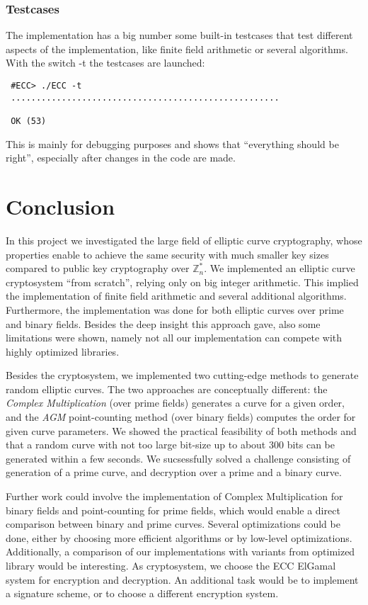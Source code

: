 \documentclass[11pt,english]{article}
\begin{document}
\subsubsection{Testcases}
The implementation has a big number some built-in testcases that test different aspects of the implementation, like finite field arithmetic or several algorithms. With the switch -t the testcases are launched:
\begin{verbatim}
 #ECC> ./ECC -t
 .....................................................

 OK (53)
\end{verbatim}
This is mainly for debugging purposes and shows that ``everything should be right'', especially after changes in the code are made.

\section{Conclusion}
In this project we investigated the large field of elliptic curve cryptography, whose properties enable to achieve the same security with much smaller key sizes compared to public key cryptography over $\mathbb{Z}_n^*$. We implemented an elliptic curve cryptosystem ``from scratch'', relying only on big integer arithmetic. This implied the implementation of finite field arithmetic and several additional algorithms. Furthermore, the implementation was done for both elliptic curves over prime and binary fields. Besides the deep insight this approach gave, also some limitations were shown, namely not all our implementation can compete with highly optimized libraries.

Besides the cryptosystem, we implemented two cutting-edge methods to generate random elliptic curves. The two approaches are conceptually different: the \emph{Complex Multiplication} (over prime fields) generates a curve for a given order, and the \emph{AGM} point-counting method (over binary fields) computes the order for given curve parameters. We showed the practical feasibility of both methods and that a random curve with not too large bit-size up to about 300 bits can be generated within a few seconds. We sucsessfully solved a challenge consisting of generation of a prime curve, and decryption over a prime and a binary curve. 

Further work could involve the implementation of Complex Multiplication for binary fields and point-counting for prime fields, which would enable a direct comparison between binary and prime curves. Several optimizations could be done, either by choosing more efficient algorithms or by low-level optimizations. Additionally, a comparison of our implementations with variants from optimized library would be interesting. As cryptosystem, we choose the ECC ElGamal system for encryption and decryption. An additional task would be to implement a signature scheme, or to choose a different encryption system.
\end{document}
